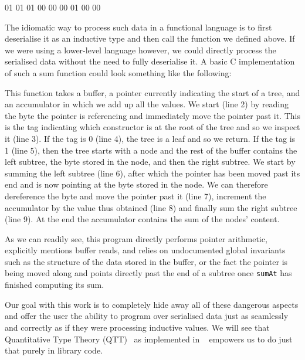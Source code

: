 \begin{hexdump}
01 01 01 00  00  00  01 00  00
\end{hexdump}

The idiomatic way to process such data in a functional language
is to first deserialise it as an inductive type and then call
the  function we defined above.
%
If we were using a lower-level language however, we could directly
process the serialised data without the need to fully deserialise it.
%
A basic C implementation of such a sum function could look something
like the following:



This function takes a buffer, a pointer currently indicating the start of
a tree, and an accumulator in which we add up all the values.
%
We start (line 2) by reading the byte the pointer is referencing and
immediately move the pointer past it.
%
This is the tag indicating which constructor is at the root of the tree
and so we inspect it (line 3).
%
If the tag is 0 (line 4), the tree is a leaf and so we return.
%
If the tag is 1 (line 5), then the tree starts with a node and the rest
of the buffer contains the left subtree, the byte stored in the node,
and then the right subtree.
%
We start by summing the left subtree (line 6),
after which the pointer has been moved past its end and is now pointing
at the byte stored in the node.
We can therefore dereference the byte and move the pointer past it (line 7),
increment the accumulator by the value thus obtained (line 8)
and finally sum the right subtree (line 9).
%
At the end the accumulator contains the sum of the nodes' content.

As we can readily see, this program
directly performs pointer arithmetic,
explicitly mentions buffer reads,
and relies on undocumented global invariants
such as the structure of the data stored in the buffer,
or the fact the pointer is being moved along and points directly past
the end of a subtree once \texttt{sumAt} has finished computing
its sum.

Our goal with this work is to completely hide away all of these
dangerous aspects
and offer the user the ability to program over serialised data
just as seamlessly and correctly as
if they were processing inductive values.
%
We will see that
Quantitative Type Theory (QTT)~\cite{DBLP:conf/birthday/McBride16, DBLP:conf/lics/Atkey18}
as implemented in \idris{}~\cite{DBLP:conf/ecoop/Brady21}
empowers us to do just that purely in library code.

